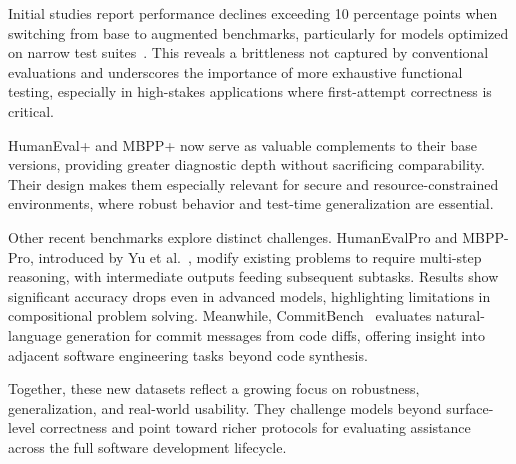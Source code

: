 Initial studies report performance declines exceeding 10 percentage points when switching from base to augmented benchmarks, particularly for models optimized on narrow test suites~\autocite{Liu2023Rigorous}. This reveals a brittleness not captured by conventional evaluations and underscores the importance of more exhaustive functional testing, especially in high-stakes applications where first-attempt correctness is critical.

HumanEval+ and \gls{MBPP}+ now serve as valuable complements to their base versions, providing greater diagnostic depth without sacrificing comparability. Their design makes them especially relevant for secure and resource-constrained environments, where robust behavior and test-time generalization are essential.

Other recent benchmarks explore distinct challenges. HumanEvalPro and MBPP-Pro, introduced by Yu et al.~\autocite{yu2024humanevalpro}, modify existing problems to require multi-step reasoning, with intermediate outputs feeding subsequent subtasks. Results show significant accuracy drops even in advanced models, highlighting limitations in compositional problem solving. Meanwhile, CommitBench~\autocite{Schall2024CommitBench} evaluates natural-language generation for commit messages from code diffs, offering insight into adjacent software engineering tasks beyond code synthesis.

Together, these new datasets reflect a growing focus on robustness, generalization, and real-world usability. They challenge models beyond surface-level correctness and point toward richer protocols for evaluating assistance across the full software development lifecycle.


